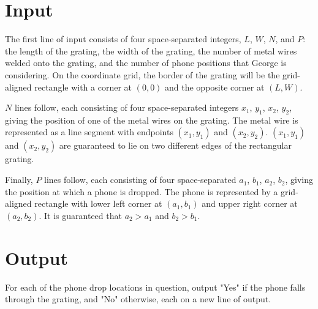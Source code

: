 \section*{Input}

The first line of input consists of four space-separated integers, $L$, $W$, $N$, and $P$: the length of
the grating, the width of the grating, the number of metal wires welded onto the grating, and the
number of phone positions that George is considering. On the coordinate grid, the border of the grating
will be the grid-aligned rectangle with a corner at $(0, 0)$ and the opposite corner at $(L, W)$.

$N$ lines follow, each consisting of four space-separated integers $x_1$, $y_1$, $x_2$, $y_2$, giving the
position of one of the metal wires on the grating. The metal wire is represented as a line segment with
endpoints $(x_1, y_1)$ and $(x_2, y_2)$. $(x_1, y_1)$ and $(x_2, y_2)$ are guaranteed to lie on two
different edges of the rectangular grating.

Finally, $P$ lines follow, each consisting of four space-separated $a_1$, $b_1$, $a_2$, $b_2$, giving the
position at which a phone is dropped. The phone is represented by a grid-aligned rectangle with lower left
corner at $(a_1, b_1)$ and upper right corner at $(a_2, b_2)$. It is guaranteed that $a_2 > a_1$ and
$b_2 > b_1$.

\section*{Output}

For each of the phone drop locations in question, output "Yes" if the phone falls through the grating,
and "No" otherwise, each on a new line of output.

